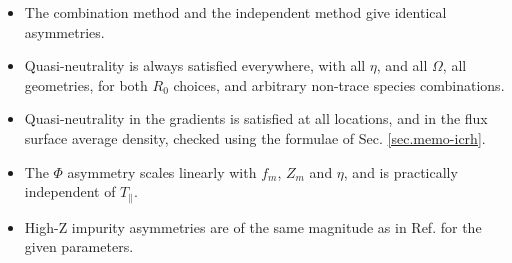 \begin{itemize}

\item The combination method and the independent method give identical asymmetries.
\item Quasi-neutrality is always satisfied everywhere, with all $\eta$, and all $\Omega$, all geometries, for both $R_0$ choices, 
and arbitrary non-trace species combinations.
\item Quasi-neutrality in the gradients is satisfied at all locations, and in the flux surface average density, checked using the formulae of Sec. \ref{sec.memo-icrh}.
\item The $\Phi$ asymmetry scales linearly with $f_m$, $Z_m$ and $\eta$, and is practically independent of $T_\parallel$.
\item High-Z impurity asymmetries are of the same magnitude as in Ref. \cite{Reinke12} for the given parameters.
\


\end{itemize}


